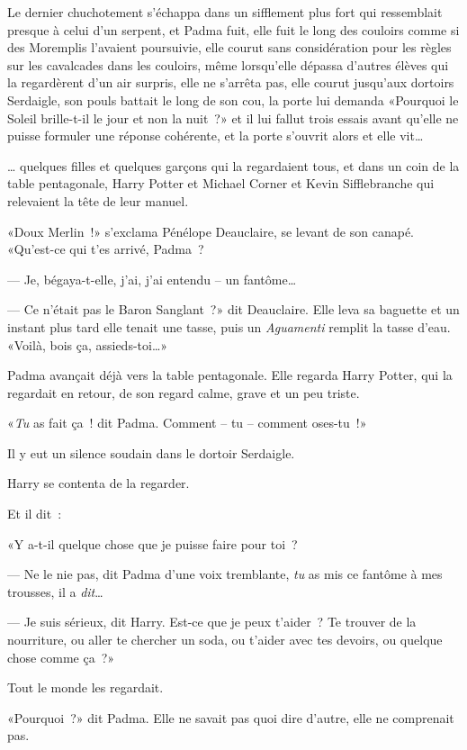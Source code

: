 Le dernier chuchotement s'échappa dans un sifflement plus fort qui ressemblait presque à celui d'un serpent, et Padma fuit, elle fuit le long des couloirs comme si des Moremplis l'avaient poursuivie, elle courut sans considération pour les règles sur les cavalcades dans les couloirs, même lorsqu'elle dépassa d'autres élèves qui la regardèrent d'un air surpris, elle ne s'arrêta pas, elle courut jusqu'aux dortoirs Serdaigle, son pouls battait le long de son cou, la porte lui demanda «Pourquoi le Soleil brille-t-il le jour et non la nuit~?» et il lui fallut trois essais avant qu'elle ne puisse formuler une réponse cohérente, et la porte s'ouvrit alors et elle vit…

… quelques filles et quelques garçons qui la regardaient tous, et dans un coin de la table pentagonale, Harry Potter et Michael Corner et Kevin Sifflebranche qui relevaient la tête de leur manuel.

«Doux Merlin~!» s'exclama Pénélope Deauclaire, se levant de son canapé. «Qu'est-ce qui t'es arrivé, Padma~?

--- Je, bégaya-t-elle, j'ai, j'ai entendu -- un fantôme…

--- Ce n'était pas le Baron Sanglant~?» dit Deauclaire. Elle leva sa baguette et un instant plus tard elle tenait une tasse, puis un \emph{Aguamenti} remplit la tasse d'eau. «Voilà, bois ça, assieds-toi…»

Padma avançait déjà vers la table pentagonale. Elle regarda Harry Potter, qui la regardait en retour, de son regard calme, grave et un peu triste.

«\emph{Tu} as fait ça~! dit Padma. Comment -- tu -- comment oses-tu~!»

Il y eut un silence soudain dans le dortoir Serdaigle.

Harry se contenta de la regarder.

Et il dit~:

«Y a-t-il quelque chose que je puisse faire pour toi~?

--- Ne le nie pas, dit Padma d'une voix tremblante, \emph{tu} as mis ce fantôme à mes trousses, il a \emph{dit}…

--- Je suis sérieux, dit Harry. Est-ce que je peux t'aider~? Te trouver de la nourriture, ou aller te chercher un soda, ou t'aider avec tes devoirs, ou quelque chose comme ça~?»

Tout le monde les regardait.

«Pourquoi~?» dit Padma. Elle ne savait pas quoi dire d'autre, elle ne comprenait pas.

